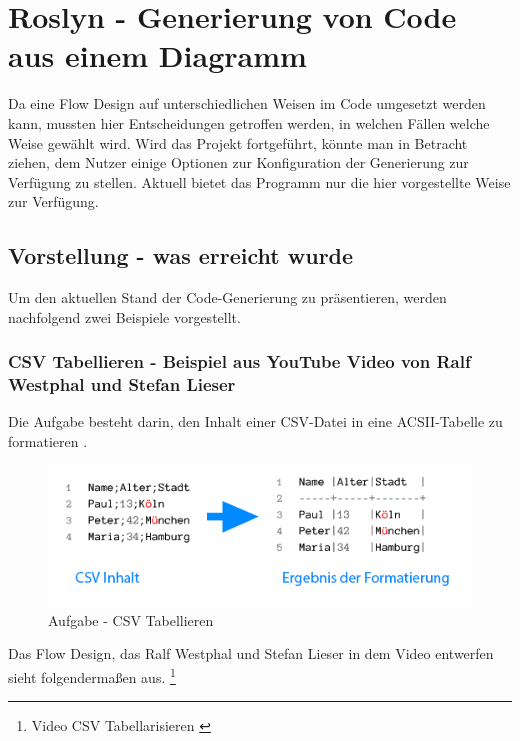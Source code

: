 \section{Roslyn - Generierung von Code aus einem Diagramm}

Da eine Flow Design auf unterschiedlichen Weisen im Code umgesetzt werden
kann, mussten hier Entscheidungen getroffen werden, in welchen Fällen
welche Weise gewählt wird. Wird das Projekt fortgeführt, könnte man in
Betracht ziehen, dem Nutzer einige Optionen zur Konfiguration der Generierung
zur Verfügung zu stellen. Aktuell bietet das Programm nur die hier vorgestellte Weise zur Verfügung.


\subsection{Vorstellung - was erreicht wurde}

Um den aktuellen Stand der Code-Generierung zu präsentieren, werden nachfolgend zwei Beispiele 
vorgestellt.

\subsubsection{CSV Tabellieren -  Beispiel aus YouTube Video von Ralf Westphal und Stefan Lieser}

Die Aufgabe besteht darin, den Inhalt einer CSV-Datei in eine ACSII-Tabelle zu formatieren \cite[S.12]{kata}.
\begin{figure}[H]
	\centering
	\includegraphics[width=0.8\linewidth]{./img/csvAufgabe.png}
	\caption{Aufgabe - CSV Tabellieren}
\end{figure}


Das Flow Design, das Ralf Westphal und Stefan Lieser in dem Video entwerfen sieht folgendermaßen aus. \footnote{Video CSV Tabellarisieren \cite{youtubevideos}}


